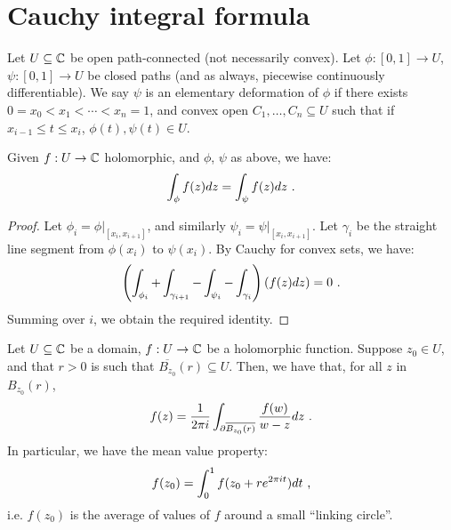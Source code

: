 
\section{Cauchy integral formula}

\begin{definition}
  Let $U \subseteq \mathbb{C}$ be open path-connected (not necessarily convex).
Let $\phi : [0, 1] \rightarrow U$, $\psi : [0, 1] \rightarrow U$ be closed paths (and as always, piecewise continuously differentiable).
We say $\psi$ is an elementary deformation of $\phi$ if there exists $0 = x_0 < x_1 < \dotsb < x_n = 1$, and convex open $C_1, \dotsc, C_n \subseteq U$ such that if $x_{i-1} \leq t \leq x_i$, $\phi(t), \psi(t) \in U$.
\end{definition}

\begin{proposition}
  Given $f : U \rightarrow \mathbb{C}$ holomorphic, and $\phi$, $\psi$ as above, we have:
\[
\int_\phi f(z)dz = \int_\psi f(z)dz \ \text{.}
\]
\end{proposition}

\begin{proof}
  Let $\phi_i = \phi\vert_{[x_i, x_{i+1}]}$, and similarly $\psi_i = \psi\vert_{[x_i, x_{i+1}]}$. Let $\gamma_i$ be the straight line segment from $\phi(x_i)$ to $\psi(x_i)$. By Cauchy for convex sets, we have:
\[
\left(\int_{\phi_i} + \int_{\gamma_{i+1}} - \int_{\psi_i} - \int_{\gamma_i}\right)\left(f(z)dz\right) = 0 \ \text{.}
\]
Summing over $i$, we obtain the required identity.
\end{proof}

\begin{theorem}%
Let $U \subseteq \mathbb{C}$ be a domain, $f : U \rightarrow \mathbb{C}$ be a holomorphic function. 
Suppose $z_0 \in U$, and that $r > 0$ is such that $\overline{B_{z_0}}(r) \subseteq U$. Then, we have that, for all $z$ in $B_{z_0}(r)$,
\[
 f(z) = \frac{1}{2\pi{}i} \int_{\partial \overline{B_{z_0}(r)}} \frac{f(w)}{w - z} dz \ \text{.}
\]
In particular, we have the mean value property:
\[
f(z_0) = \int_0^1 f(z_0 + re^{2\pi{}it}) dt \ \text{,}
\]
i.e. $f(z_0)$ is the average of values of $f$ around a small ``linking circle''.
\end{theorem}

